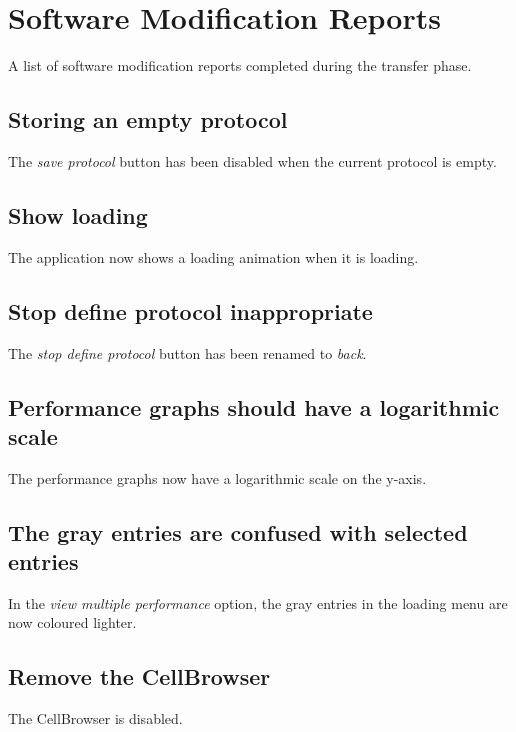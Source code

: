 \chapter{Software Modification Reports}
\label{chap:implemented}
A list of software modification reports completed during the transfer phase. 

\section*{Storing an empty protocol}
The \emph{save protocol} button has been disabled when the current protocol is empty.

\section*{Show loading}
The application now shows a loading animation when it is loading.

\section*{Stop define protocol inappropriate}
The \emph{stop define protocol} button has been renamed to \emph{back}.

\section*{Performance graphs should have a logarithmic scale}
The performance graphs now have a logarithmic scale on the y-axis.

\section*{The gray entries are confused with selected entries}
In the \emph{view multiple performance} option, the gray entries in the loading menu are now coloured lighter.

\section*{Remove the CellBrowser}
The CellBrowser is disabled.